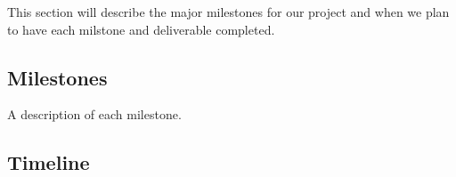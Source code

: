 This section will describe the major milestones for our project and when we plan
to have each milstone and deliverable completed.

\subsection{Milestones}

A description of each milestone.

\subsection{Timeline}

